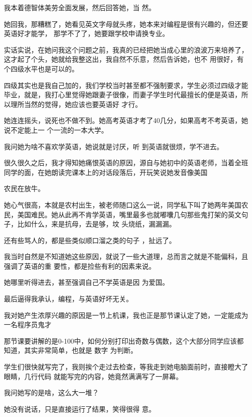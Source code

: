 \documentclass{article}
\begin{document}
我本着德智体美劳全面发展，然后回答她，当
然。 

她回我，那糟糕了，她看见英文字母就头疼，她本来对编程是很有兴趣的，但还要英语好才能学，
那学不了了，她要跟学校申请换专业。 

\newpage

实话实说，在她问我这个问题之前，我真的已经把她当成心里的浪波万来培养了，这才起了个头，她就给我整这出，我自然不乐意，然后告诉她，也不
用很好，有个四级水平也是可以的。 

四级其实也是我自己加的，我们学校当时甚至都不强制要求，学生必须过四级才能毕业，就是，我打心里觉得她跟妻子很像，而妻子学生时代最擅长的便是英语，所以理所当然的觉得，她应该也要英语好
才行。 

她连连摇头，说死也不做不到。她高考英语才考了40几分，如果高考不考英语，她说不定能上一
个一流的一本大学。 

我问她为啥不喜欢学英语，她说就是讨厌，听
到英语就很烦，学不进去。 

很久很久之后，我才得知她痛恨英语的原因，源自与她初中的英语老师，当着全班同学的面，在她朗读完课本上的对话段落后，开玩笑说她发音像美国
\newpage

农民在放牛。 

她心气很高，本就是农村出生，被老师随口这么一说，同学私下叫了她两年美国农民，美国难民。她从此再不肯学英语，嘴里最多也就嘟囔几句那些鬼打架的英文句子，比如什么，来是抗母，去是够，坟
头烧纸，漏漏漏。 

还有些骂人的，都是些类似顺口溜之类的句子
，扯远了。 

我当时自然是不知道她这些原因，就说了一些大道理，总而言之就是不能偏科，且强调了英语的重
要性，都是捡些有利的因素来说。 

她哪里听得进去，甚至强调自己不学英语是因
为爱国。 


最后逼得我承认，编程，与英语好坏无关。 


\newpage

我对她产生浓厚兴趣的原因是一节上机课，我也正是那节课认定了她，一定能成为一名程序员鬼才

那节课要讲解的是0-100中，如何分别打印出奇数与偶数，这个大部分同学应该都知道，其实非常简单，也就是 数字%
为判断。 

学生们很快就写完了，我则挨个走过去检查，等我走到她电脑面前时，直接瞪大了眼睛，几行代码
就能写完的内容，她竟然满满写了一屏幕。 


我问她写的是啥，这么大一堆？ 

她没有说话，只是直接运行了结果，笑得很得
意。 
\end{document}

